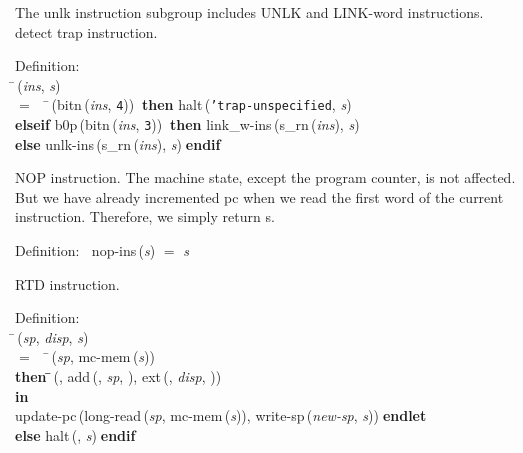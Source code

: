  The unlk instruction subgroup includes UNLK and LINK-word instructions.
 detect trap instruction.
\begin{tabbing}{\sc Definition}: \\  
\=\,({\it{ins\/}}, {\it{s\/}}) \\ 
$=$$\;\;\;\;$\=\,({\rm{bitn}}\,({\it{ins\/}}, {\tt{4}}))$\;\;${\bf then }{\rm{halt}}\,({\tt{'}}{\tt{trap-unspecified}}, {\it{s\/}}) \\ 
{\bf elseif }{\rm{b0p}}\,({\rm{bitn}}\,({\it{ins\/}}, {\tt{3}}))$\;\;${\bf then }{\rm{link\_w-ins}}\,({\rm{s\_rn}}\,({\it{ins\/}}), {\it{s\/}}) \\ 
{\bf else }{\rm{unlk-ins}}\,({\rm{s\_rn}}\,({\it{ins\/}}), {\it{s\/}})$\;${\bf  endif}\-\-
\end{tabbing}

 NOP instruction.
 The machine state, except the program counter, is not affected.  But
 we have already incremented pc when we read the first word of the
 current instruction.  Therefore, we simply return s.
\begin{tabbing}{\sc Definition}:$\;\;$
{\rm{nop-ins}}\,({\it{s\/}}) $=$ {\it{s\/}}
\end{tabbing}

 RTD instruction.
\begin{tabbing}{\sc Definition}: \\  
\=\,({\it{sp\/}}, {\it{disp\/}}, {\it{s\/}}) \\ 
$=$$\;\;\;\;$\=\,({\it{sp\/}}, {\rm{mc-mem}}\,({\it{s\/}})) \\ 
{\bf then }\=\=\,({}, {\rm{add}}\,({}, {\it{sp\/}}, {}), {\rm{ext}}\,({}, {\it{disp\/}}, {}))\- \\ 
{\bf in} \\ 
{\rm{update-pc}}\,({\rm{long-read}}\,({\it{sp\/}}, {\rm{mc-mem}}\,({\it{s\/}})), {\rm{write-sp}}\,({\it{new-sp\/}}, {\it{s\/}}))$\;${\bf  endlet}\- \\ 
{\bf else }{\rm{halt}}\,({}, {\it{s\/}})$\;${\bf  endif}\-\-
\end{tabbing}

